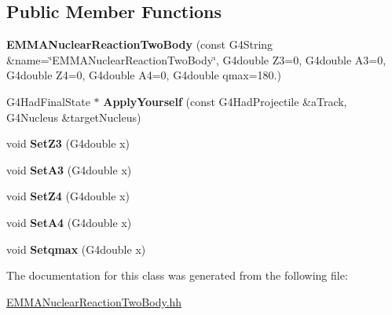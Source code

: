 \subsection*{Public Member Functions}
\begin{DoxyCompactItemize}
\item 
\hypertarget{classEMMANuclearReactionTwoBody_a0dd02a4c8d38a6916e7ed23cc9e213a8}{{\bfseries E\-M\-M\-A\-Nuclear\-Reaction\-Two\-Body} (const G4\-String \&name=\char`\"{}E\-M\-M\-A\-Nuclear\-Reaction\-Two\-Body\char`\"{}, G4double Z3=0, G4double A3=0, G4double Z4=0, G4double A4=0, G4double qmax=180.)}\label{classEMMANuclearReactionTwoBody_a0dd02a4c8d38a6916e7ed23cc9e213a8}

\item 
\hypertarget{classEMMANuclearReactionTwoBody_adabd41fecb77c840a16563a1a634d801}{G4\-Had\-Final\-State $\ast$ {\bfseries Apply\-Yourself} (const G4\-Had\-Projectile \&a\-Track, G4\-Nucleus \&target\-Nucleus)}\label{classEMMANuclearReactionTwoBody_adabd41fecb77c840a16563a1a634d801}

\item 
\hypertarget{classEMMANuclearReactionTwoBody_a9447090cb2afa0ef5a32aae528e264c0}{void {\bfseries Set\-Z3} (G4double x)}\label{classEMMANuclearReactionTwoBody_a9447090cb2afa0ef5a32aae528e264c0}

\item 
\hypertarget{classEMMANuclearReactionTwoBody_a021a4d5414273ec6804f3dec14abceec}{void {\bfseries Set\-A3} (G4double x)}\label{classEMMANuclearReactionTwoBody_a021a4d5414273ec6804f3dec14abceec}

\item 
\hypertarget{classEMMANuclearReactionTwoBody_a587804c646adcdd2faf82911653fd563}{void {\bfseries Set\-Z4} (G4double x)}\label{classEMMANuclearReactionTwoBody_a587804c646adcdd2faf82911653fd563}

\item 
\hypertarget{classEMMANuclearReactionTwoBody_a3dacff6490f78c2697b85d7c7e03944a}{void {\bfseries Set\-A4} (G4double x)}\label{classEMMANuclearReactionTwoBody_a3dacff6490f78c2697b85d7c7e03944a}

\item 
\hypertarget{classEMMANuclearReactionTwoBody_ad58d8bd62381f9b6b8a65c4c929dca53}{void {\bfseries Setqmax} (G4double x)}\label{classEMMANuclearReactionTwoBody_ad58d8bd62381f9b6b8a65c4c929dca53}

\end{DoxyCompactItemize}


The documentation for this class was generated from the following file\-:\begin{DoxyCompactItemize}
\item 
\hyperlink{EMMANuclearReactionTwoBody_8hh}{E\-M\-M\-A\-Nuclear\-Reaction\-Two\-Body.\-hh}\end{DoxyCompactItemize}
